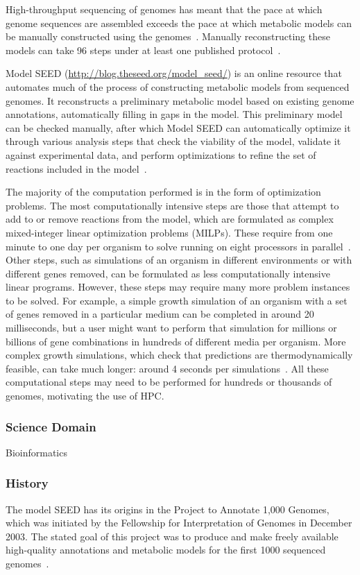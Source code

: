 \documentclass[10pt,letterpaper]{article}
\begin{document}
High-throughput sequencing of genomes has meant that the
pace at which genome sequences are assembled
exceeds the pace at which metabolic models can be manually constructed
using the genomes~\cite{henry-09}.  Manually reconstructing these models
can take 96 steps under at least one published protocol~\cite{henry-10}.

Model SEED (\url{http://blog.theseed.org/model_seed/}) is an online resource 
that automates much of the process
of constructing metabolic models from sequenced genomes.
It reconstructs a preliminary metabolic model
based on existing genome annotations, automatically filling in gaps in the
model.  This preliminary model can be checked manually, after which
Model SEED can automatically
optimize it through various analysis steps that
check the viability of the model, validate it against experimental data,
and perform optimizations to refine the set of reactions
included in the model~\cite{henry-10}.

The majority of the computation performed is in the form of
optimization problems.  The most computationally intensive
steps are those that attempt to add  to or remove reactions from the model, which
are formulated as complex mixed-integer linear
optimization problems (MILPs).  These require from one minute
to one day per organism to solve running on eight processors
in parallel~\cite{henry-09}.  Other steps, such
as simulations of an organism in different environments or with different genes removed, can be formulated as less computationally
intensive linear programs. However, these steps may require many more
problem instances to be solved.
For example, a simple growth simulation of an organism with a
set of genes removed
in a particular medium can be completed in around 20 milliseconds, but
a user might want to perform that simulation for millions or billions of
gene combinations in hundreds of different media per organism.  More
complex growth simulations, which check that predictions are thermodynamically
feasible, can take much longer: around 4 seconds per simulations~\cite{henry-09}.
All these computational steps may need to be performed
for hundreds or thousands of genomes, motivating the use of HPC.



\subsubsection{Science Domain} Bioinformatics

\subsubsection{History}
The model SEED has its origins in the Project to Annotate
1,000 Genomes, which was initiated by the Fellowship for Interpretation of Genomes
in December 2003.  The stated goal of this project was to produce and
make freely available high-quality annotations and metabolic models for
the first 1000 sequenced genomes~\cite{seed-manifesto-04}.
\end{document}
